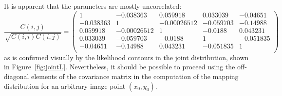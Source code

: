 \documentclass[manuscript]{aastex}
\begin{document}
It is apparent that the parameters are mostly uncorrelated:
\[\frac{C(i,j)}{\sqrt{C(i,i)C(i,j)}} = \left(\begin{array}{ccccc}
1&-0.038363&0.059918&0.033039&-0.04651\\
-0.038363&1&-0.00026512&-0.059703&-0.14988\\
0.059918&-0.00026512&1&-0.0188&0.043231\\
0.033039&-0.059703&-0.0188&1&-0.051835\\
-0.04651&-0.14988&0.043231&-0.051835&1\\
\end{array}\right)\]
as is confirmed visually by the likelihood contours in the joint distribution, shown in Figure~\ref{fig:jointL}. Nevertheless, it should be possible to proceed using the off-diagonal elements of the covariance matrix in the computation of the mapping distribution for an arbitrary image point $(x_0,y_0)$.
\end{document}
